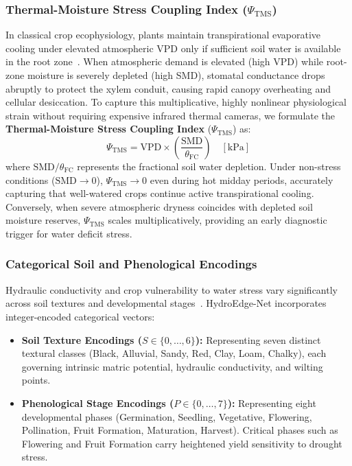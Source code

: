 \subsubsection{Thermal-Moisture Stress Coupling Index \texorpdfstring{($\Psi_{\text{TMS}}$)}{(Psi\_TMS)}}
In classical crop ecophysiology, plants maintain transpirational evaporative cooling under elevated atmospheric VPD only if sufficient soil water is available in the root zone~\cite{jackson1981canopy, idso1981normalizing}. When atmospheric demand is elevated (high VPD) while root-zone moisture is severely depleted (high SMD), stomatal conductance drops abruptly to protect the xylem conduit, causing rapid canopy overheating and cellular desiccation. To capture this multiplicative, highly nonlinear physiological strain without requiring expensive infrared thermal cameras, we formulate the \textbf{Thermal-Moisture Stress Coupling Index} ($\Psi_{\text{TMS}}$) as:
\begin{equation}
\Psi_{\text{TMS}} = \text{VPD} \times \left( \frac{\text{SMD}}{\theta_{\text{FC}}} \right) \quad [\text{kPa}]
\label{eq:tms}
\end{equation}
where $\text{SMD} / \theta_{\text{FC}}$ represents the fractional soil water depletion. Under non-stress conditions ($\text{SMD} \to 0$), $\Psi_{\text{TMS}} \to 0$ even during hot midday periods, accurately capturing that well-watered crops continue active transpirational cooling. Conversely, when severe atmospheric dryness coincides with depleted soil moisture reserves, $\Psi_{\text{TMS}}$ scales multiplicatively, providing an early diagnostic trigger for water deficit stress.

\subsubsection{Categorical Soil and Phenological Encodings}
Hydraulic conductivity and crop vulnerability to water stress vary significantly across soil textures and developmental stages~\cite{wu2026agpstc}. HydroEdge-Net incorporates integer-encoded categorical vectors:
\begin{itemize}
    \item \textbf{Soil Texture Encodings ($S \in \{0, \dots, 6\}$):} Representing seven distinct textural classes (Black, Alluvial, Sandy, Red, Clay, Loam, Chalky), each governing intrinsic matric potential, hydraulic conductivity, and wilting points.
    \item \textbf{Phenological Stage Encodings ($P \in \{0, \dots, 7\}$):} Representing eight developmental phases (Germination, Seedling, Vegetative, Flowering, Pollination, Fruit Formation, Maturation, Harvest). Critical phases such as Flowering and Fruit Formation carry heightened yield sensitivity to drought stress.
\end{itemize}

